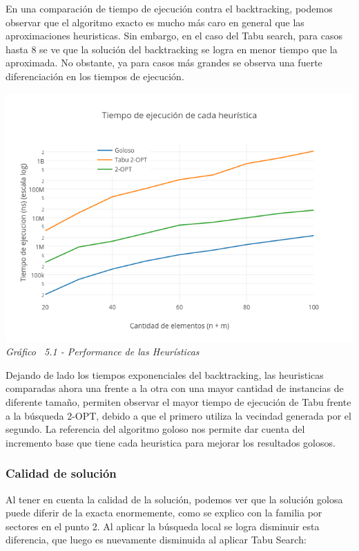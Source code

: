 En una comparación de tiempo de ejecución contra el backtracking, podemos observar que el algoritmo exacto es mucho más caro en general que las aproximaciones heuristicas. Sin embargo, en el caso del Tabu search, para casos hasta 8 se ve que la solución del backtracking se logra en menor tiempo que la aproximada. No obstante, ya para casos más grandes se observa una fuerte diferenciación en los tiempos de ejecución.

\vspace*{0.3cm} \vspace*{0.3cm}
  \begin{center}
 \includegraphics[scale=0.5]{./EJ5/medicion.png}\\
 {\textit{Gráfico \ 5.1 - Performance de las Heur\'isticas}}
  \end{center}
  \vspace*{0.3cm}

Dejando de lado los tiempos exponenciales del backtracking, las heuristicas comparadas ahora una frente a la otra con una mayor cantidad de instancias de diferente tamaño, permiten observar el mayor tiempo de ejecución de Tabu frente a la búsqueda 2-OPT, debido a que el primero utiliza la vecindad generada por el segundo. La referencia del algoritmo goloso nos permite dar cuenta del incremento base que tiene cada heuristica para mejorar los resultados golosos.

\subsubsection*{Calidad de solución}

Al tener en cuenta la calidad de la solución, podemos ver que la solución golosa puede diferir de la exacta enormemente, como se explico con la familia por sectores en el punto 2. Al aplicar la búsqueda local se logra disminuir esta diferencia, que luego es nuevamente disminuida al aplicar Tabu Search:

